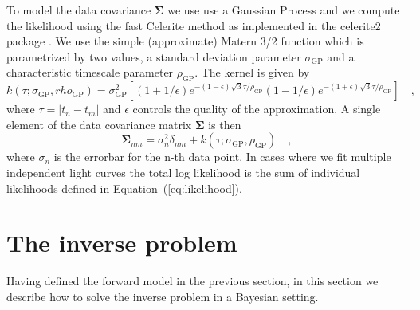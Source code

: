 \documentclass[modern]{aastex62}
\begin{document}
To model the data covariance $\boldsymbol{\Sigma}$ we use use a Gaussian Process and we compute the likelihood using the fast Celerite method \citep{foreman-mackey2017} as implemented in the \textsf{celerite2} package \citep{foreman-mackey2017a,foreman-mackey2018}.
We use the simple (approximate) Matern 3/2 function which is parametrized by two values, a standard deviation parameter $\sigma_\mathrm{GP}$ and a characteristic timescale parameter $\rho_\mathrm{GP}$.
The kernel is given by 
\begin{equation}
    k(\tau;\sigma_\mathrm{GP},
    rho_\mathrm{GP})=\sigma_\mathrm{GP}^{2}\left[(1+1 / \epsilon) e^{-(1-\epsilon) \sqrt{3} \tau / \rho_\mathrm{GP}}(1-1 / \epsilon) e^{-(1+\epsilon) \sqrt{3} \tau / \rho_\mathrm{GP}}\right]
    \quad,
\end{equation}
where $\tau=|t_n-t_m|$ and $\epsilon$ controls the quality of the approximation.
A single element of the data covariance matrix $\boldsymbol{\Sigma}$ is then 
\begin{equation}
    \boldsymbol{\Sigma}_{nm}=\sigma_n^2\delta_{nm} + k(\tau;\sigma_\mathrm{GP},\rho_\mathrm{GP})
    \quad,
    \label{eq:data_covariance_element}
\end{equation}
where $\sigma_n$ is the errorbar for the n-th data point.
In cases where we fit multiple independent light curves the total log likelihood is the sum of individual likelihoods defined in Equation~(\ref{eq:likelihood}).

\section{The inverse problem}
\label{sec:inverse_problem}
Having defined the forward model in the previous section, in this section we describe how to solve the inverse problem in a Bayesian setting.
\end{document}
